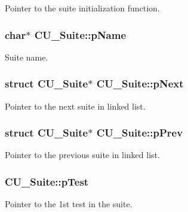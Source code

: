 Pointer to the suite initialization function. 

\hypertarget{structCU__Suite_ac70274e00c1c5b7b6a8368c9a0ab6195}{
\subsubsection[{p\-Name}]{\setlength{\rightskip}{0pt plus 5cm}char$\ast$ C\-U\-\_\-\-Suite\-::p\-Name}}\label{structCU__Suite_ac70274e00c1c5b7b6a8368c9a0ab6195}


Suite name. 

\hypertarget{structCU__Suite_a695a5eb0087e2d64adc53da4518de69c}{
\subsubsection[{p\-Next}]{\setlength{\rightskip}{0pt plus 5cm}struct {\bf C\-U\-\_\-\-Suite}$\ast$ C\-U\-\_\-\-Suite\-::p\-Next}}\label{structCU__Suite_a695a5eb0087e2d64adc53da4518de69c}


Pointer to the next suite in linked list. 

\hypertarget{structCU__Suite_aa161293fb2ba337e52e1f6c9f5d68448}{
\subsubsection[{p\-Prev}]{\setlength{\rightskip}{0pt plus 5cm}struct {\bf C\-U\-\_\-\-Suite}$\ast$ C\-U\-\_\-\-Suite\-::p\-Prev}}\label{structCU__Suite_aa161293fb2ba337e52e1f6c9f5d68448}


Pointer to the previous suite in linked list. 

\hypertarget{structCU__Suite_ad56c4b9f273fdc8c3f504b62178dfdd6}{
\subsubsection[{p\-Test}]{ C\-U\-\_\-\-Suite\-::p\-Test}}\label{structCU__Suite_ad56c4b9f273fdc8c3f504b62178dfdd6}


Pointer to the 1st test in the suite. 

